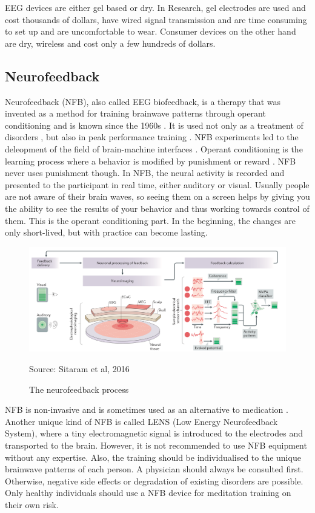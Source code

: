 \documentclass{llncs} %
\newcommand{\source}[1]{\hfill Source: {#1} }
\begin{document}
EEG devices are either gel based or dry. In Research, gel electrodes are used and cost thousands of dollars, have wired signal transmission and are time consuming to set up and are uncomfortable to wear.
Consumer devices on the other hand are dry, wireless and cost only a few hundreds of dollars. \cite{Decho}
\subsection{Neurofeedback}
Neurofeedback (NFB), also called EEG biofeedback, is a therapy that was invented as a method for training brainwave patterns through operant conditioning and is known since the 1960s \cite{Hammond}. 
It is used not only as a treatment of disorders \cite{brand:del}, but also in peak performance training \cite{Kaufman}. NFB experiments led to the deleopment of the field of brain-machine interfaces \cite{Sitaram}. 
Operant conditioning is the learning process where a behavior is modified by punishment or reward \cite{Spence}. NFB never uses punishment though. In NFB, the neural activity is recorded and presented to the participant in real time, either auditory or visual.  
Usually people are not aware of their brain waves, so seeing them on a screen helps by giving you the ability to see the results of your behavior and thus working towards control of them. This is the operant conditioning part. In the beginning, the changes are only short-lived, but with practice can become lasting. 

\begin{figure}
    \includegraphics[width=\linewidth]{Neurofeedback.png}
    \caption{The neurofeedback process}  
    \label{neurofeedback}
    \source{Sitaram et al, 2016}
\end{figure}

NFB is non-invasive and is sometimes used as an alternative to medication \cite{Hammond}. Another unique kind of NFB is called LENS (Low Energy Neurofeedback System), where a tiny electromagnetic signal is introduced to the electrodes and transported to the brain.
However, it is not recommended to use NFB equipment without any expertise. Also, the training should be individualised to the unique brainwave patterns of each person. A physician should always be consulted first.
Otherwise, negative side effects or degradation of existing disorders are possible. Only healthy individuals should use a NFB device for meditation training on their own risk.
\end{document}
